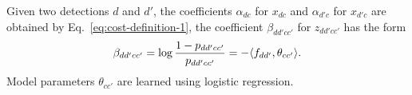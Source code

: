 Given two detections $d$ and $d'$,
the coefficients $\alpha_{dc}$ for $x_{dc}$ and $\alpha_{d'c}$ for $x_{d'c}$ are obtained by Eq.~\ref{eq:cost-definition-1},
the coefficient $\beta_{dd'cc'}$ for $z_{dd'cc'}$ has the form
\begin{align}
\small
  \beta_{dd'cc'} = \log \frac{1 - p_{dd'cc'}}{p_{dd'cc'}} = -\langle f_{dd'},  \theta_{cc'}\rangle.
  \label{cost-probability-feature}
\end{align}
Model parameters $\theta_{cc'}$ are learned using logistic regression.


